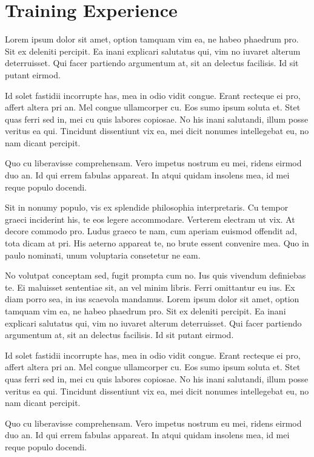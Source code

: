 \section{Training Experience}
Lorem ipsum dolor sit amet, option tamquam vim ea, ne habeo phaedrum pro. Sit ex deleniti percipit. Ea inani explicari salutatus qui, vim no iuvaret alterum deterruisset. Qui facer partiendo argumentum at, sit an delectus facilisis. Id sit putant eirmod.

Id solet fastidii incorrupte has, mea in odio vidit congue. Erant recteque ei pro, affert altera pri an. Mel congue ullamcorper cu. Eos sumo ipsum soluta et. Stet quas ferri sed in, mei cu quis labores copiosae. No his inani salutandi, illum posse veritus ea qui. Tincidunt dissentiunt vix ea, mei dicit nonumes intellegebat eu, no nam dicant percipit.

Quo cu liberavisse comprehensam. Vero impetus nostrum eu mei, ridens eirmod duo an. Id qui errem fabulas appareat. In atqui quidam insolens mea, id mei reque populo docendi.

Sit in nonumy populo, vis ex splendide philosophia interpretaris. Cu tempor graeci inciderint his, te eos legere accommodare. Verterem electram ut vix. At decore commodo pro. Ludus graeco te nam, cum aperiam euismod offendit ad, tota dicam at pri. His aeterno appareat te, no brute essent convenire mea. Quo in paulo nominati, unum voluptaria consetetur ne eam.

No volutpat conceptam sed, fugit prompta cum no. Ius quis vivendum definiebas te. Ei maluisset sententiae sit, an vel minim libris. Ferri omittantur eu ius. Ex diam porro sea, in ius scaevola mandamus.
Lorem ipsum dolor sit amet, option tamquam vim ea, ne habeo phaedrum pro. Sit ex deleniti percipit. Ea inani explicari salutatus qui, vim no iuvaret alterum deterruisset. Qui facer partiendo argumentum at, sit an delectus facilisis. Id sit putant eirmod.

Id solet fastidii incorrupte has, mea in odio vidit congue. Erant recteque ei pro, affert altera pri an. Mel congue ullamcorper cu. Eos sumo ipsum soluta et. Stet quas ferri sed in, mei cu quis labores copiosae. No his inani salutandi, illum posse veritus ea qui. Tincidunt dissentiunt vix ea, mei dicit nonumes intellegebat eu, no nam dicant percipit.

Quo cu liberavisse comprehensam. Vero impetus nostrum eu mei, ridens eirmod duo an. Id qui errem fabulas appareat. In atqui quidam insolens mea, id mei reque populo docendi.

